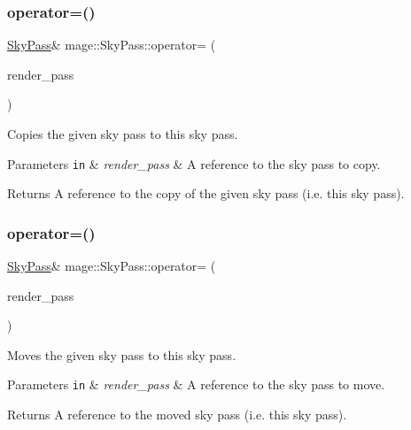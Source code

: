 \subsubsection{\texorpdfstring{operator=()}{operator=()}\hspace{0.1cm}{\footnotesize\ttfamily [1/2]}}
{\footnotesize\ttfamily \hyperlink{classmage_1_1_sky_pass}{Sky\+Pass}\& mage\+::\+Sky\+Pass\+::operator= (\begin{DoxyParamCaption}\item[{const \hyperlink{classmage_1_1_sky_pass}{Sky\+Pass} \&}]{render\+\_\+pass }\end{DoxyParamCaption})\hspace{0.3cm}{\ttfamily [delete]}}

Copies the given sky pass to this sky pass.


\begin{DoxyParams}[1]{Parameters}
\mbox{\tt in}  & {\em render\+\_\+pass} & A reference to the sky pass to copy. \\
\hline
\end{DoxyParams}
\begin{DoxyReturn}{Returns}
A reference to the copy of the given sky pass (i.\+e. this sky pass). 
\end{DoxyReturn}
\hypertarget{classmage_1_1_sky_pass_ae15ed24b3bbf4008b90e4cfcb4117a84}{}\label{classmage_1_1_sky_pass_ae15ed24b3bbf4008b90e4cfcb4117a84} 
\subsubsection{\texorpdfstring{operator=()}{operator=()}\hspace{0.1cm}{\footnotesize\ttfamily [2/2]}}
{\footnotesize\ttfamily \hyperlink{classmage_1_1_sky_pass}{Sky\+Pass}\& mage\+::\+Sky\+Pass\+::operator= (\begin{DoxyParamCaption}\item[{\hyperlink{classmage_1_1_sky_pass}{Sky\+Pass} \&\&}]{render\+\_\+pass }\end{DoxyParamCaption})\hspace{0.3cm}{\ttfamily [delete]}}

Moves the given sky pass to this sky pass.


\begin{DoxyParams}[1]{Parameters}
\mbox{\tt in}  & {\em render\+\_\+pass} & A reference to the sky pass to move. \\
\hline
\end{DoxyParams}
\begin{DoxyReturn}{Returns}
A reference to the moved sky pass (i.\+e. this sky pass). 
\end{DoxyReturn}
\hypertarget{classmage_1_1_sky_pass_a0096c4f62d622033503245418a0e23df}{}\label{classmage_1_1_sky_pass_a0096c4f62d622033503245418a0e23df} 
